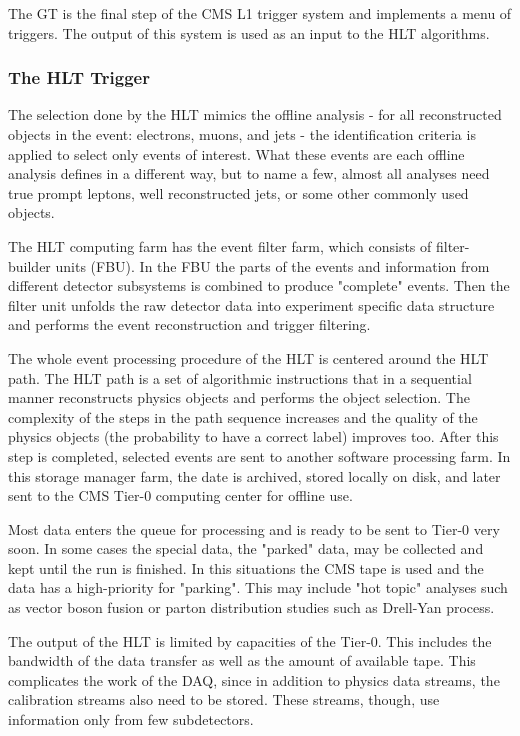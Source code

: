 \begin{normalsize}
The GT is the final step of the CMS L1 trigger system and implements a menu of triggers. The output of this system is used as an input to the HLT algorithms. 



\subsubsection{The HLT Trigger}

The selection done by the HLT mimics the offline analysis - for all reconstructed objects in the event: electrons, muons, and jets - the identification criteria is applied to select only events of interest. What these events are each offline analysis defines in a different way, but to name a few, almost all analyses need true prompt leptons, well reconstructed jets, or some other commonly used objects. 


The HLT computing farm has the event filter farm, which consists of filter-builder units (FBU). In the FBU the parts of the events and information from different detector subsystems is combined to produce "complete" events. Then the filter unit unfolds the raw detector data into experiment specific data structure and performs the event reconstruction and trigger filtering. 


The whole event processing procedure of the HLT is centered around the HLT path. The HLT path is a set of algorithmic instructions that in a sequential manner reconstructs physics objects and performs the object selection. The complexity of the steps in the path sequence increases and the quality of the physics objects (the probability to have a correct label) improves too. After this step is completed, selected events are sent to another software processing farm. In this storage manager farm, the date is archived, stored locally on disk, and later sent to the CMS Tier-0 computing center for offline use. 

Most data enters the queue for processing and is ready to be sent to Tier-0 very soon. In some cases the special data, the "parked" data, may be collected and kept until the run is finished. In this situations the CMS tape is used and the data has a high-priority for "parking". This may include "hot topic" analyses such as vector boson fusion or parton distribution studies such as Drell-Yan process.

The output of the HLT is limited by capacities of the Tier-0. This includes the bandwidth of the data transfer as well as the amount of available tape. This complicates the work of the DAQ, since in addition to physics data streams, the calibration streams also need to be stored. These streams, though, use information only from few subdetectors. 



\end{normalsize}
